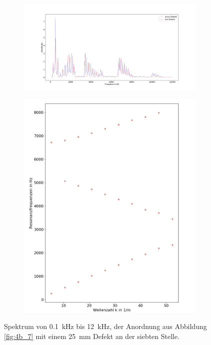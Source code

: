 \begin{figure}
\centering
\begin{subfigure}{0.65\textwidth}
\includegraphics[width=\textwidth]{content/Scripts/defect6.jpg}
\end{subfigure}
\begin{subfigure}{0.34\textwidth}
\includegraphics[width=\textwidth]{content/Scripts/4b_7_2c.jpg}
\end{subfigure}
\caption{Spektrum von 0.1~kHz bis 12~kHz, der Anordnung aus Abbildung \ref{fig:4b_7} mit einem 25~mm Defekt an der siebten Stelle.}
\label{fig:4b_7_2c}
\end{figure}
